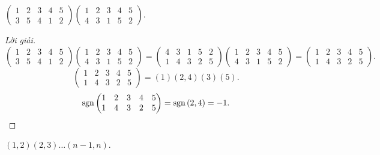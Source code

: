 \begin{exercise}
    $
        \begin{pmatrix}
            1 & 2 & 3 & 4 & 5 \\
            3 & 5 & 4 & 1 & 2
        \end{pmatrix}
        \begin{pmatrix}
            1 & 2 & 3 & 4 & 5 \\
            4 & 3 & 1 & 5 & 2
        \end{pmatrix}
    $.
\end{exercise}

\begin{proof}[Lời giải]
    \[
        \begin{pmatrix}
            1 & 2 & 3 & 4 & 5 \\
            3 & 5 & 4 & 1 & 2
        \end{pmatrix}
        \begin{pmatrix}
            1 & 2 & 3 & 4 & 5 \\
            4 & 3 & 1 & 5 & 2
        \end{pmatrix}
        =
        \begin{pmatrix}
            4 & 3 & 1 & 5 & 2 \\
            1 & 4 & 3 & 2 & 5
        \end{pmatrix}
        \begin{pmatrix}
            1 & 2 & 3 & 4 & 5 \\
            4 & 3 & 1 & 5 & 2
        \end{pmatrix}
        =
        \begin{pmatrix}
            1 & 2 & 3 & 4 & 5 \\
            1 & 4 & 3 & 2 & 5
        \end{pmatrix}.
    \]
    \[
        \begin{pmatrix}
            1 & 2 & 3 & 4 & 5 \\
            1 & 4 & 3 & 2 & 5
        \end{pmatrix}
        =
        (1)(2,4)(3)(5).
    \]
    \[
        \text{sgn}\left({
            \begin{matrix}
                1 & 2 & 3 & 4 & 5 \\
                1 & 4 & 3 & 2 & 5
            \end{matrix}
        }\right)
        = \text{sgn}\left({2,4}\right)
        = -1.
    \]
\end{proof}

\begin{exercise}
    $(1,2)(2,3)\ldots (n-1,n)$.
\end{exercise}


